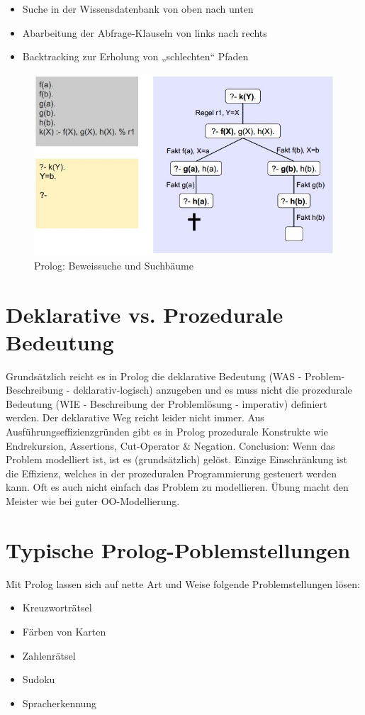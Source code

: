 \begin{itemize}
	\item Suche in der Wissensdatenbank von oben nach unten
	\item Abarbeitung der Abfrage-Klauseln von links nach rechts
	\item Backtracking zur Erholung von „schlechten“ Pfaden
\end{itemize}

\begin{figure}[h!]
\centering
\includegraphics[width=0.47\linewidth]{fig/prolog-beweissuche-suchbaueme}
\caption{Prolog: Beweissuche und Suchbäume}
\label{fig:prolog-beweissuche-suchbaueme}
\end{figure}

\section{Deklarative vs. Prozedurale Bedeutung}
Grundsätzlich reicht es in Prolog die deklarative Bedeutung (WAS - Problem-Beschreibung - deklarativ-logisch) anzugeben und es muss nicht die prozedurale Bedeutung (WIE - Beschreibung der Problemlösung - imperativ) definiert werden. Der deklarative Weg reicht leider nicht immer. Aus Ausführungseffizienzgründen gibt es in Prolog prozedurale Konstrukte wie Endrekursion, Assertions, Cut-Operator \& Negation. Conclusion: Wenn das Problem modelliert ist, ist es (grundsätzlich) gelöst. Einzige Einschränkung ist die Effizienz, welches in der prozeduralen Programmierung gesteuert werden kann. Oft es auch nicht einfach das Problem zu modellieren. Übung macht den Meister wie bei guter OO-Modellierung.

\newpage

\section{Typische Prolog-Poblemstellungen}
Mit Prolog lassen sich auf nette Art und Weise folgende Problemstellungen lösen: 

\begin{itemize}
	\item Kreuzworträtsel
	\item Färben von Karten
	\item Zahlenrätsel
	\item Sudoku
	\item Spracherkennung
\end{itemize}

